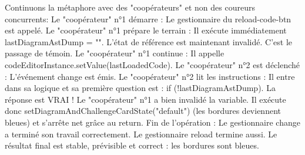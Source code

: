 \documentclass[11pt,a4paper]{article}
\begin{document}
Continuons la métaphore avec des "coopérateurs" et non des coureurs concurrents:
Le "coopérateur" n°1 démarre : Le gestionnaire du reload-code-btn est appelé.
Le "coopérateur" n°1 prépare le terrain : Il exécute immédiatement lastDiagramAstDump = "". L'état de référence est maintenant invalidé. C'est le passage de témoin.
Le "coopérateur" n°1 continue : Il appelle codeEditorInstance.setValue(lastLoadedCode).
Le "coopérateur" n°2 est déclenché : L'événement change est émis.
Le "coopérateur" n°2 lit les instructions :
Il entre dans sa logique et sa première question est : if (!lastDiagramAstDump).
La réponse est VRAI ! Le "coopérateur" n°1 a bien invalidé la variable.
Il exécute donc setDiagramAndChallengeCardState("default") (les bordures deviennent bleues) et s'arrête net grâce au return.
Fin de l'opération : Le gestionnaire change a terminé son travail correctement. Le gestionnaire reload termine aussi. Le résultat final est stable, prévisible et correct : les bordures sont bleues.
\end{document}
